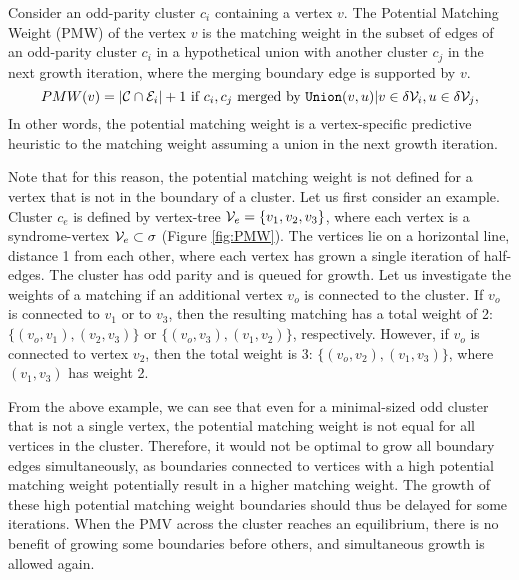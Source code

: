 \begin{definition}\label{def:pmw}
  Consider an odd-parity cluster $c_i$ containing a vertex $v$. The Potential Matching Weight (PMW) of the vertex $v$ is the matching weight in the subset of edges of an odd-parity cluster $c_i$ in a hypothetical union with another cluster $c_j$ in the next growth iteration, where the merging boundary edge is supported by $v$. 
  \begin{equation}
    PMW(v) = \abs{\mathcal{C} \cap \mathcal{E}_{i}} + 1 \text{ if } c_i, c_j \text{ merged by } \texttt{Union}(v,u) | v \in \delta\mathcal{V}_{i}, u \in \delta\mathcal{V}_{j}, 
  \end{equation}
  In other words, the potential matching weight is a vertex-specific predictive heuristic to the matching weight assuming a union in the next growth iteration. 
\end{definition}

Note that for this reason, the potential matching weight is not defined for a vertex that is not in the boundary of a cluster. Let us first consider an example. Cluster $c_e$ is defined by vertex-tree $\mathcal{V}_e = \{v_1, v_2, v_3\}$, where each vertex is a syndrome-vertex $\mathcal{V}_e \subset \sigma$ (Figure \ref{fig:PMW}). The vertices lie on a horizontal line, distance 1 from each other, where each vertex has grown a single iteration of half-edges. The cluster has odd parity and is queued for growth. Let us investigate the weights of a matching if an additional vertex $v_o$ is connected to the cluster. If $v_o$ is connected to $v_1$ or to $v_3$, then the resulting matching has a total weight of 2: $\{(v_o,v_1), (v_2,v_3)\}$ or $\{(v_o,v_3),(v_1,v_2)\}$, respectively. However, if $v_o$ is connected to vertex $v_2$, then the total weight is 3: $\{(v_o, v_2),(v_1, v_3)\}$, where $(v_1,v_3)$ has weight 2. 

From the above example, we can see that even for a minimal-sized odd cluster that is not a single vertex, the potential matching weight is not equal for all vertices in the cluster. Therefore, it would not be optimal to grow all boundary edges simultaneously, as boundaries connected to vertices with a high potential matching weight potentially result in a higher matching weight. The growth of these high potential matching weight boundaries should thus be delayed for some iterations. When the PMV across the cluster reaches an equilibrium, there is no benefit of growing some boundaries before others, and simultaneous growth is allowed again.



